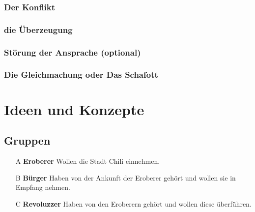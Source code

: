 \documentclass[a4paper, 12pt]{report}
\newcommand\backmatter{ \cleardoublepage \pagenumbering{roman}}
\begin{document}
\subsection{Der Konflikt}

\subsection{die Überzeugung}

\subsection{Störung der Ansprache (optional)}

\subsection{Die Gleichmachung oder Das Schafott}


\backmatter

\chapter* {Ideen und Konzepte}\label{ideen_konzepte}
\section*{Gruppen}
\begin{itemize}
    \item[A] \textbf{Eroberer} Wollen die Stadt Chili einnehmen.
    \item[B] \textbf{Bürger} Haben von der Ankunft der Eroberer gehört und wollen sie in Empfang nehmen.
    \item[C] \textbf{Revoluzzer} Haben von den Eroberern gehört und wollen diese überführen.
\end{itemize}
\end{document}
